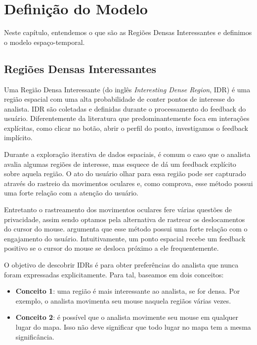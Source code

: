 \chapter{Definição do Modelo}
\label{chap:modelo}

Neste capítulo, entendemos o que são as Regiões Densas Interessantes e definimos o modelo espaço-temporal.

\section{Regiões Densas Interessantes}


Uma Região Densa Interessante (do inglês {\em Interesting Dense Region}, IDR) é uma região espacial com uma alta probabilidade de conter pontos de interesse do analista. IDR são coletadas e definidas durante o processamento do feedback do usuário. Diferentemente da literatura que predominantemente foca em interações explícitas, como clicar no botão, abrir o perfil do ponto, investigamos o feedback implícito.

Durante a exploração iterativa de dados espaciais, é comum o caso que o analista avalia algumas regiões de interesse, mas esquece de dá um feedback explícito sobre aquela região. O ato do usuário olhar para essa região pode ser capturado através do rastreio da movimentos oculares e, como  comprova, esse método possui uma forte relação com a atenção do usuário.

Entretanto o rastreamento dos movimentos oculares fere várias questões de privacidade, assim sendo optamos pela alternativa de rastrear os deslocamentos do cursor do mouse.  argumenta que esse método possui uma forte relação com o engajamento do usuário. Intuitivamente, um ponto espacial recebe um feedback positivo se o cursor do mouse se desloca próximo a ele frequentemente.

O objetivo de descobrir IDRs é para obter preferências do analista que nunca foram expressadas explicitamente. Para tal, baseamos em dois conceitos:

\begin{itemize}
	\item \textbf{Conceito 1}: uma região é mais interessante ao analista, se for densa. Por exemplo, o analista movimenta seu mouse naquela regiãos várias vezes.
	\item \textbf{Conceito 2}: é possível que o analista movimente seu mouse em qualquer lugar do mapa. Isso não deve significar que todo lugar no mapa tem a mesma significância.
\end{itemize}


